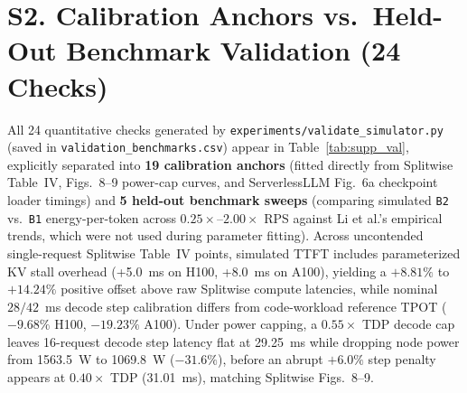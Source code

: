 \documentclass[11pt,a4paper]{article}
\begin{document}
\section*{S2. Calibration Anchors vs.\ Held-Out Benchmark Validation (24 Checks)}
All 24 quantitative checks generated by \texttt{experiments/validate\_simulator.py} (saved in \texttt{validation\_benchmarks.csv}) appear in Table~\ref{tab:supp_val}, explicitly separated into \textbf{19 calibration anchors} (fitted directly from Splitwise Table~IV, Figs.~8--9 power-cap curves, and ServerlessLLM Fig.~6a checkpoint loader timings) and \textbf{5 held-out benchmark sweeps} (comparing simulated \texttt{B2} vs.\ \texttt{B1} energy-per-token across $0.25\times$--$2.00\times$ RPS against Li et al.'s empirical trends, which were not used during parameter fitting). Across uncontended single-request Splitwise Table~IV points, simulated TTFT includes parameterized KV stall overhead (+5.0~ms on H100, +8.0~ms on A100), yielding a $+8.81\%$ to $+14.24\%$ positive offset above raw Splitwise compute latencies, while nominal $28/42$~ms decode step calibration differs from code-workload reference TPOT ($-9.68\%$ H100, $-19.23\%$ A100). Under power capping, a $0.55\times$ TDP decode cap leaves 16-request decode step latency flat at 29.25~ms while dropping node power from 1563.5~W to 1069.8~W ($-31.6\%$), before an abrupt $+6.0\%$ step penalty appears at $0.40\times$ TDP (31.01~ms), matching Splitwise Figs.~8--9.
\end{document}
